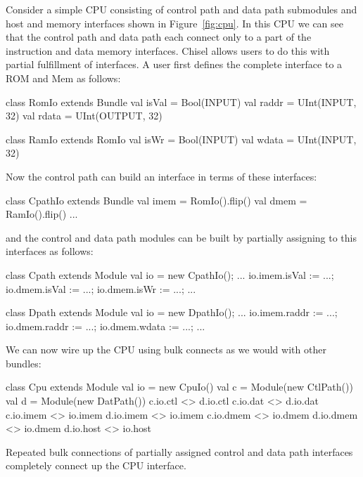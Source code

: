 \documentclass[twocolumn,10pt]{article}
\begin{document}
Consider a simple CPU consisting of control path and data path submodules and host and memory interfaces shown in Figure~\ref{fig:cpu}.
In this CPU we can see that the control path and data path each connect only to a part of the instruction and data memory interfaces. 
Chisel allows users to do this with partial fulfillment of interfaces.
A user first defines the complete interface to a ROM and Mem as follows:

\begin{scala}
class RomIo extends Bundle {
  val isVal = Bool(INPUT)
  val raddr = UInt(INPUT, 32)
  val rdata = UInt(OUTPUT, 32)
}

class RamIo extends RomIo {
  val isWr  = Bool(INPUT)
  val wdata = UInt(INPUT, 32)
}
\end{scala}

\noindent
Now the control path can build an interface in terms of these interfaces:

\begin{scala}
class CpathIo extends Bundle {
  val imem = RomIo().flip()
  val dmem = RamIo().flip()
  ...
}
\end{scala}

\noindent
and the control and data path modules can be built by partially assigning to
this interfaces as follows:

\begin{scala}
class Cpath extends Module {
  val io = new CpathIo();
  ...
  io.imem.isVal := ...;
  io.dmem.isVal := ...;
  io.dmem.isWr  := ...;
  ...
}

class Dpath extends Module {
  val io = new DpathIo();
  ...
  io.imem.raddr := ...;
  io.dmem.raddr := ...;
  io.dmem.wdata := ...;
  ...
}
\end{scala}

\noindent
We can now wire up the CPU using bulk connects as we would with other bundles:

\begin{scala}
class Cpu extends Module {
  val io = new CpuIo()
  val c  = Module(new CtlPath())
  val d  = Module(new DatPath())
  c.io.ctl  <> d.io.ctl
  c.io.dat  <> d.io.dat
  c.io.imem <> io.imem
  d.io.imem <> io.imem
  c.io.dmem <> io.dmem
  d.io.dmem <> io.dmem
  d.io.host <> io.host
}
\end{scala}

\noindent
Repeated bulk connections of partially assigned control and data path interfaces
completely connect up the CPU interface.
\end{document}
